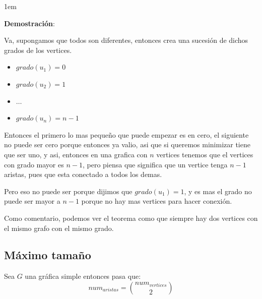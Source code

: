 \documentclass[12pt, fleqn]{report}                             %
\newenvironment{SmallIndentation}[1][0.75em]                    %
        {\begin{adjustwidth}{#1}{}\begin{footnotesize}}             %
        {\end{footnotesize}\end{adjustwidth}}                       %
\theoremstyle{break}                                            %
\begin{document}
                    \begin{SmallIndentation}[1em]
                        \textbf{Demostración}:

                        Va, supongamos que todos son diferentes, entonces crea una sucesión de dichos grados de los
                        vertices.
                        \begin{itemize}
                            \item  $grado(u_1) = 0$
                            \item  $grado(u_2) = 1$
                            \item  $\dots$
                            \item  $grado(u_n) = n - 1$
                        \end{itemize}

                        Entonces el primero lo mas pequeño que puede empezar es en cero, el siguiente
                        no puede ser cero porque entonces ya valio, asi que si queremos minimizar tiene que ser
                        uno, y asi, entonces en una grafica con $n$ vertices tenemos que el vertices con grado 
                        mayor es $n - 1$, pero piensa que significa que un vertice tenga $n - 1$ aristas, pues
                        que esta conectado a todos los demas.

                        Pero eso no puede ser porque dijimos que $grado(u_1) = 1$, y es mas el grado no puede ser
                        mayor a $n - 1$ porque no hay mas vertices para hacer conexión.


                    \end{SmallIndentation}

                Como comentario, podemos ver el teorema como que siempre hay dos vertices con el mismo grafo
                con el mismo grado.


            \subsection{Máximo tamaño}

                Sea $G$ una gráfica simple entonces pasa que:
                \begin{equation*}
                    num_{aristas} = {num_{vertices} \choose 2}
                \end{equation*}
                
\end{document}
